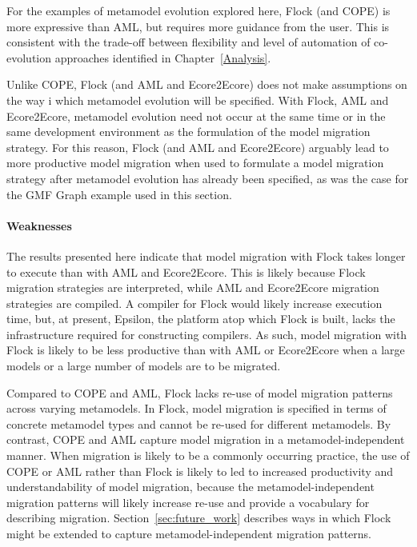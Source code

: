 For the examples of metamodel evolution explored here, Flock (and COPE) is more expressive than AML, but requires more guidance from the user. This is consistent with the trade-off between flexibility and level of automation of co-evolution approaches identified in Chapter~\ref{Analysis}.

Unlike COPE, Flock (and AML and Ecore2Ecore) does not make assumptions on the way i which metamodel evolution will be specified. With Flock, AML and Ecore2Ecore, metamodel evolution need not occur at the same time or in the same development environment as the formulation of the model migration strategy. For this reason, Flock (and AML and Ecore2Ecore) arguably lead to more productive model migration when used to formulate a model migration strategy after metamodel evolution has already been specified, as was the case for the GMF Graph example used in this section.

\paragraph{Weaknesses} The results presented here indicate that model migration with Flock takes longer to execute than with AML and Ecore2Ecore. This is likely because Flock migration strategies are interpreted, while AML and Ecore2Ecore migration strategies are compiled. A compiler for Flock would likely increase execution time, but, at present, Epsilon, the platform atop which Flock is built, lacks the infrastructure required for constructing compilers. As such, model migration with Flock is likely to be less productive than with AML or Ecore2Ecore when a large models or a large number of models are to be migrated.

Compared to COPE and AML, Flock lacks re-use of model migration patterns across varying metamodels. In Flock, model migration is specified in terms of concrete metamodel types and cannot be re-used for different metamodels. By contrast, COPE and AML capture model migration in a metamodel-independent manner. When migration is likely to be a commonly occurring practice, the use of COPE or AML rather than Flock is likely to led to increased productivity and understandability of model migration, because the metamodel-independent migration patterns will likely increase re-use and provide a vocabulary for describing migration. Section~\ref{sec:future_work} describes ways in which Flock might be extended to capture metamodel-independent migration patterns.


